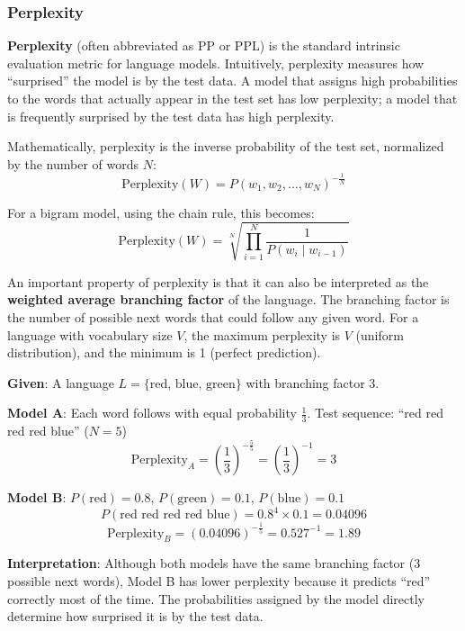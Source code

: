 \documentclass[11pt,a4paper]{article}
\begin{document}
\subsubsection{Perplexity}

\textbf{Perplexity} (often abbreviated as PP or PPL) is the standard intrinsic evaluation metric for language models. Intuitively, perplexity measures how ``surprised'' the model is by the test data. A model that assigns high probabilities to the words that actually appear in the test set has low perplexity; a model that is frequently surprised by the test data has high perplexity.

Mathematically, perplexity is the inverse probability of the test set, normalized by the number of words $N$:
\[
\text{Perplexity}(W) = P(w_1, w_2, \ldots, w_N)^{-\frac{1}{N}}
\]

For a bigram model, using the chain rule, this becomes:
\[
\text{Perplexity}(W) = \sqrt[N]{\prod_{i=1}^{N} \frac{1}{P(w_i \mid w_{i-1})}}
\]

An important property of perplexity is that it can also be interpreted as the \textbf{weighted average branching factor} of the language. The branching factor is the number of possible next words that could follow any given word. For a language with vocabulary size $V$, the maximum perplexity is $V$ (uniform distribution), and the minimum is 1 (perfect prediction).

\begin{tcolorbox}[colback=green!5!white,colframe=green!75!black,title=\textbf{Worked Example 4: Perplexity as Weighted Average Branching Factor}]
\textbf{Given}: A language $L = \{\text{red, blue, green}\}$ with branching factor 3.

\textbf{Model A}: Each word follows with equal probability $\frac{1}{3}$.
Test sequence: ``red red red red blue'' ($N=5$)
\[
\text{Perplexity}_A = \left(\frac{1}{3}\right)^{-\frac{5}{5}} = \left(\frac{1}{3}\right)^{-1} = 3
\]

\textbf{Model B}: $P(\text{red}) = 0.8$, $P(\text{green}) = 0.1$, $P(\text{blue}) = 0.1$
\[
P(\text{red red red red blue}) = 0.8^4 \times 0.1 = 0.04096
\]
\[
\text{Perplexity}_B = (0.04096)^{-\frac{1}{5}} = 0.527^{-1} = 1.89
\]

\textbf{Interpretation}: Although both models have the same branching factor (3 possible next words), Model B has lower perplexity because it predicts ``red'' correctly most of the time. The probabilities assigned by the model directly determine how surprised it is by the test data.
\end{tcolorbox}
\end{document}
